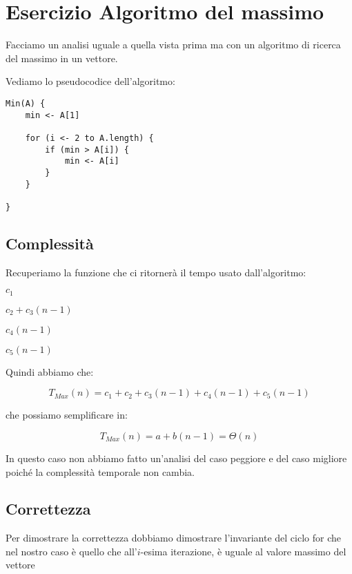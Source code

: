 \section{Esercizio Algoritmo del massimo}
\begin{flushleft}

Facciamo un analisi uguale a quella vista prima ma con un algoritmo di ricerca del massimo 
in un vettore.

\bigskip

Vediamo lo pseudocodice dell'algoritmo:

\begin{lstlisting}
Min(A) {
	min <- A[1]
	
	for (i <- 2 to A.length) {
		if (min > A[i]) {
			min <- A[i]
		}
	}

}
\end{lstlisting}
\end{flushleft}

\subsection{Complessità}

\begin{flushleft}
Recuperiamo la funzione che ci ritornerà il tempo usato dall'algoritmo:

\medskip


$c_1$

\medskip


$c_2 + c_3 (n-1)$

\medskip


$c_4 (n - 1)$

\medskip


$c_5 (n-1)$

\medskip

Quindi abbiamo che:

\[T_{Max}(n) = c_1 + c_2 + c_3 (n-1) + c_4 (n-1) + c_5 (n-1)\]

che possiamo semplificare in:

\[T_{Max}(n) = a + b (n-1) = \Theta(n)\]

In questo caso non abbiamo fatto un'analisi del caso peggiore e del caso migliore poiché
la complessità temporale non cambia.

\end{flushleft}

\subsection{Correttezza}

\begin{flushleft}

Per dimostrare la correttezza dobbiamo dimostrare l'invariante del ciclo for che nel
nostro caso è quello che all'$i$-esima iterazione,  è uguale al valore massimo
del vettore  

\end{flushleft}